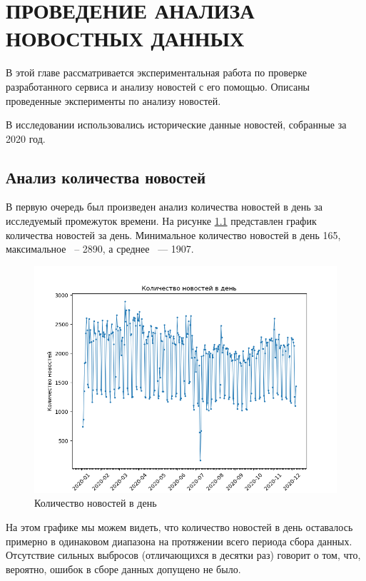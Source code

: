 \chapter{ПРОВЕДЕНИЕ АНАЛИЗА НОВОСТНЫХ ДАННЫХ}
\label{chap:research}
\aftertitle

В этой главе рассматривается экспериментальная работа по проверке разработанного сервиса и анализу новостей с его помощью. Описаны проведенные эксперименты по анализу новостей.

В исследовании использовались исторические данные новостей, собранные за 2020 год.

\section{Анализ количества новостей}

В первую очередь был произведен анализ количества новостей в день за исследуемый промежуток времени. На рисунке \ref{img:news-count} представлен график количества новостей за день. Минимальное количество новостей в день 165, максимальное ~-- 2890, а среднее ~--- 1907.

\begin{figure}[h]
    \centering
    \includegraphics[width=\linewidth]{images/news-count.png}
    \caption{Количество новостей в день}
    \label{img:news-count}
\end{figure}

На этом графике мы можем видеть, что количество новостей в день оставалось примерно в одинаковом диапазона на протяжении всего периода сбора данных. Отсутствие сильных выбросов (отличающихся в десятки раз) говорит о том, что, вероятно, ошибок в сборе данных допущено не было.

